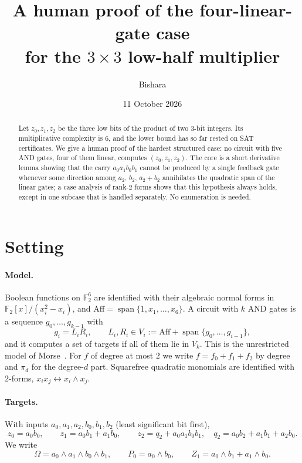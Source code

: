 \documentclass[11pt,a4paper]{article}
\title{\bfseries A human proof of the four-linear-gate case\\ for the $3\times 3$ low-half multiplier}
\author{Bishara}
\date{11 October 2026}
\theoremstyle{plain}
\theoremstyle{definition}
\theoremstyle{remark}
\newcommand{\F}{\mathbb{F}_2}
\newcommand{\Aff}{\mathrm{Aff}}
\newcommand{\Span}{\operatorname{span}}
\begin{document}
\maketitle

\begin{abstract}
\noindent
Let $z_0,z_1,z_2$ be the three low bits of the product of two 3-bit integers. Its multiplicative complexity is 6, and the lower bound has so far rested on SAT certificates. We give a human proof of the hardest structured case: no circuit with five AND gates, four of them linear, computes $(z_0,z_1,z_2)$. The core is a short derivative lemma showing that the carry $a_0a_1b_0b_1$ cannot be produced by a single feedback gate whenever some direction among $a_2$, $b_2$, $a_2+b_2$ annihilates the quadratic span of the linear gates; a case analysis of rank-2 forms shows that this hypothesis always holds, except in one subcase that is handled separately. No enumeration is needed.
\end{abstract}

\section{Setting}

\paragraph{Model.}
Boolean functions on $\F^6$ are identified with their algebraic normal forms in $\F[x]/(x_i^2-x_i)$, and $\Aff=\Span\{1,x_1,\dots,x_6\}$. A circuit with $k$ AND gates is a sequence $g_0,\dots,g_{k-1}$ with
\[
  g_i=L_iR_i,\qquad L_i,R_i\in V_i:=\Aff+\Span\{g_0,\dots,g_{i-1}\},
\]
and it computes a set of targets if all of them lie in $V_k$. This is the unrestricted model of Morse~\cite{morse}. For $f$ of degree at most $2$ we write $f=f_0+f_1+f_2$ by degree and $\pi_d$ for the degree-$d$ part. Squarefree quadratic monomials are identified with 2-forms, $x_ix_j\leftrightarrow x_i\wedge x_j$.

\paragraph{Targets.}
With inputs $a_0,a_1,a_2,b_0,b_1,b_2$ (least significant bit first),
\[
  z_0=a_0b_0,\qquad z_1=a_0b_1+a_1b_0,\qquad z_2=q_2+a_0a_1b_0b_1,\quad q_2=a_0b_2+a_1b_1+a_2b_0 .
\]
We write
\[
  \Omega=a_0\wedge a_1\wedge b_0\wedge b_1,\qquad P_0=a_0\wedge b_0,\qquad Z_1=a_0\wedge b_1+a_1\wedge b_0 .
\]
\end{document}
